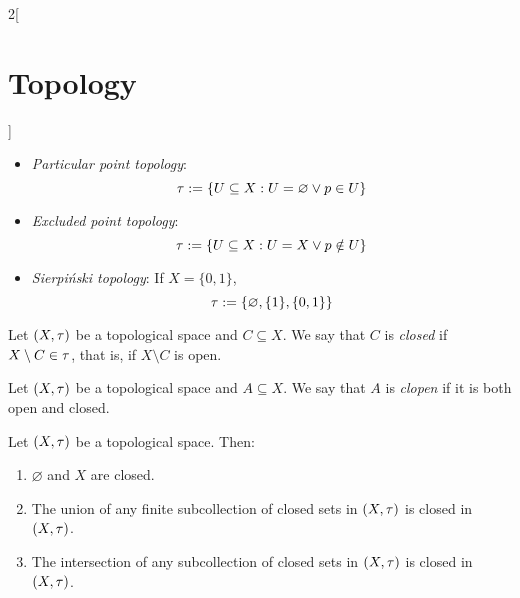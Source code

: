\documentclass[../../../main.tex]{subfiles}
\begin{document}
\begin{multicols}{2}[\section{Topology}]
\begin{proposition}
\begin{itemize}
      \item \emph{Particular point topology}: $$\tau:=\{U\subseteq X:U=\varnothing\lor p\in U\}$$
      \item \emph{Excluded point topology}: $$\tau:=\{U\subseteq X:U=X\lor p\notin U\}$$
      \item \emph{Sierpiński topology}: If $X=\{0,1\}$, $$\tau:=\{\varnothing,\{1\},\{0,1\}\}$$
    \end{itemize}
  \end{proposition}
  \begin{definition}
    Let $(X,\tau)$ be a topological space and $C\subseteq X$. We say that $C$ is \emph{closed} if $X\setminus C\in\tau$, that is, if $X\setminus C$ is open.
  \end{definition}
  \begin{definition}
    Let $(X,\tau)$ be a topological space and $A\subseteq X$. We say that $A$ is \emph{clopen} if it is both open and closed.
  \end{definition}
  \begin{proposition}
    Let $(X,\tau)$ be a topological space. Then:
    \begin{enumerate}
      \item $\varnothing$ and $X$ are closed.
      \item The union of any finite subcollection of closed sets in $(X,\tau)$ is closed in $(X,\tau)$.
      \item The intersection of any subcollection of closed sets in $(X,\tau)$ is closed in $(X,\tau)$.
    \end{enumerate}
  \end{proposition}

\end{multicols}
\end{document}
